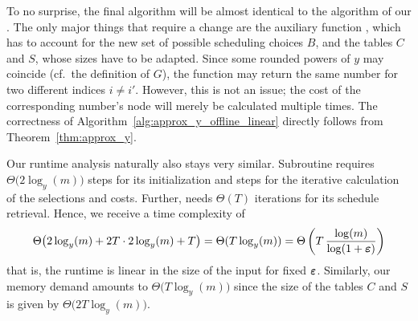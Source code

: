 To no surprise, the final algorithm will be almost identical to the algorithm of our . The only major things that require a change are the auxiliary function , which has to account for the new set of possible scheduling choices $B$, and the tables $C$ and $S$, whose sizes have to be adapted. Since some rounded powers of $y$ may coincide (cf.\ the definition of $G$), the function  may return the same number for two different indices $i\neq i'$. However, this is not an issue; the cost of the corresponding number's node will merely be calculated multiple times.
The correctness of Algorithm~\ref{alg:approx_y_offline_linear} directly follows from Theorem~\ref{thm:approx_y}.

Our runtime analysis naturally also stays very similar. Subroutine  requires $\Theta\bigl(2\log_y(m)\bigr)$ steps for its initialization and  steps for the iterative calculation of the selections and costs. Further,  needs $\Theta(T)$ iterations for its schedule retrieval. Hence, we receive a time complexity of
\begin{equation*}
	\Theta\bigl(2\log_y(m)+2T\cdot2\log_y(m)+T\bigr)=\Theta(T\log_y(m))=\Theta\left(T\,\frac{\log(m)}{\log(1+\boldsymbol\varepsilon)}\right)
\end{equation*}
that is, the runtime is linear in the size of the input for fixed $\boldsymbol\varepsilon$. Similarly, our memory demand amounts to $\Theta\bigl(T\log_y(m)\bigr)$ since the size of the tables $C$ and $S$ is given by $\Theta\bigl(2T\log_y(m)\bigr)$.

